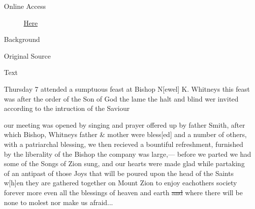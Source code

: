 				\begin{description}
					\item[Online Access] \href{https://www.josephsmithpapers.org/paper-summary/journal-1835-1836/102}{Here}
				\end{description}
				
				\begin{description}
					\item[Background]
				\end{description}
				
				
				\begin{description}
					\item[Original Source]
				\end{description}
				
				
				\begin{description}
					\item[Text]
				\end{description}
				
					Thursday 7 attended a sumptuous feast at Bishop N[ewel] K. Whitneys this feast was after the order of the Son of God the lame the halt and blind wer invited according to the intruction of the Saviour
					
					our meeting was opened by singing and prayer offered up by father Smith, after which Bishop, Whitneys father \& mother were bless[ed] and a number of others, with a patriarchal blessing, we then recieved a bountiful refreshment, furnished by the liberality of the Bishop the company was large,--- before we parted we had some of the Songs of Zion sung, and our hearts were made glad while partaking of an antipast of those Joys that will be poured upon the head of the Saints w[h]en they are gathered together on Mount Zion to enjoy eachothers society forever more even all the blessings of heaven and earth \sout{and} where there will be none to molest nor make us afraid...
					
